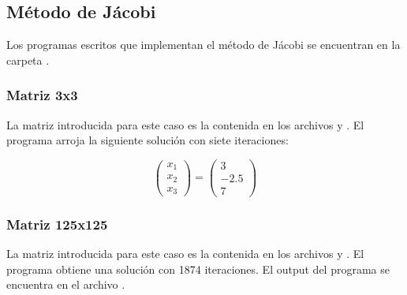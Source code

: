 \subsection{Método de Jácobi}

Los programas escritos que implementan el método de Jácobi se encuentran en la carpeta .

\subsubsection{Matriz 3x3}

La matriz introducida para este caso es la contenida en los archivos  y . El programa arroja la siguiente solución con siete iteraciones:

\begin{equation*}
    \begin{pmatrix}
        x_1 \\
        x_2 \\
        x_3
    \end{pmatrix} =
    \begin{pmatrix}
        3    \\
        -2.5 \\
        7
    \end{pmatrix}
\end{equation*}

\subsubsection{Matriz 125x125}

La matriz introducida para este caso es la contenida en los archivos  y . El programa obtiene una solución con 1874 iteraciones. El output del programa se encuentra en el archivo .

